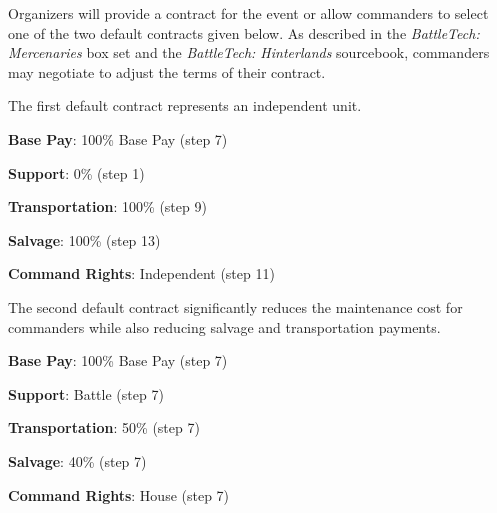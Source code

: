 Organizers will provide a contract for the event or allow commanders to select one of the two default contracts given below.
As described in the \emph{BattleTech: Mercenaries} box set and the \emph{BattleTech: Hinterlands} sourcebook, commanders may negotiate to adjust the terms of their contract.

The first default contract represents an independent unit.

\begin{description}

  \item \textbf{Base Pay}: 100\% Base Pay (step 7)

  \item \textbf{Support}: 0\% (step 1)

  \item \textbf{Transportation}: 100\% (step 9)

  \item \textbf{Salvage}: 100\% (step 13)

  \item \textbf{Command Rights}: Independent (step 11)

\end{description}

The second default contract significantly reduces the maintenance cost for commanders while also reducing salvage and transportation payments.

\begin{description}

  \item \textbf{Base Pay}: 100\% Base Pay (step 7)

  \item \textbf{Support}: Battle (step 7)

  \item \textbf{Transportation}: 50\% (step 7)

  \item \textbf{Salvage}: 40\% (step 7)

  \item \textbf{Command Rights}: House (step 7)

\end{description}
